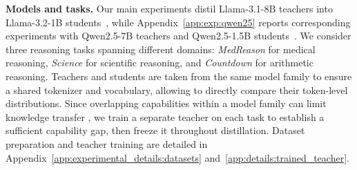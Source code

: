 \documentclass{article} %
\theoremstyle{plain}
\theoremstyle{definition}
\theoremstyle{remark}
\begin{document}
\textbf{Models and tasks.}
Our main experiments distil Llama-3.1-8B teachers into Llama-3.2-1B students~\citep{grattafiori_llama_2024}, while Appendix~\ref{app:exp:qwen25} reports corresponding experiments with Qwen2.5-7B teachers and Qwen2.5-1.5B students~\citep{qwen2025qwen25technicalreport}. We consider three reasoning tasks spanning different domains: \textit{MedReason} \citep{wu2025medreasonelicitingfactualmedical} for medical reasoning, \textit{Science} \citep{feng2024sciknoweval} for scientific reasoning, and \textit{Countdown} \citep{tinyzero} for arithmetic reasoning.
Teachers and students are taken from the same model family to ensure a shared tokenizer and vocabulary, allowing to directly compare their token-level distributions.
Since overlapping capabilities within a model family can limit knowledge transfer \citep{li_rethinking_2026}, we train a separate teacher on each task to establish a sufficient capability gap, then freeze it throughout distillation.
Dataset preparation and teacher training are detailed in Appendix~\ref{app:experimental_details:datasets} and~\ref{app:details:trained_teacher}.
\end{document}
